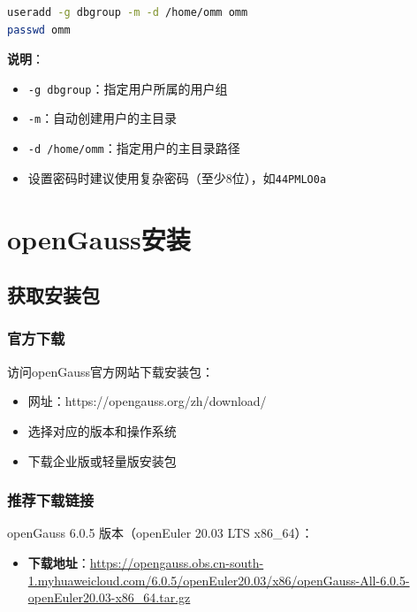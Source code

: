 \documentclass[12pt,UTF8]{ctexbook}
\begin{document}
\begin{lstlisting}[language=bash, caption=创建数据库用户]
useradd -g dbgroup -m -d /home/omm omm
passwd omm
\end{lstlisting}

\textbf{说明}：
\begin{itemize}[leftmargin=2cm]
    \item \texttt{-g dbgroup}：指定用户所属的用户组
    \item \texttt{-m}：自动创建用户的主目录
    \item \texttt{-d /home/omm}：指定用户的主目录路径
    \item 设置密码时建议使用复杂密码（至少8位），如\texttt{44PMLO0a}
\end{itemize}

\chapter{openGauss安装}

\section{获取安装包}

\subsection{官方下载}

访问openGauss官方网站下载安装包：

\begin{itemize}[leftmargin=2cm]
    \item 网址：https://opengauss.org/zh/download/
    \item 选择对应的版本和操作系统
    \item 下载企业版或轻量版安装包
\end{itemize}

\subsection{推荐下载链接}

openGauss 6.0.5 版本（openEuler 20.03 LTS x86\_64）：

\begin{itemize}[leftmargin=2cm]
    \item \textbf{下载地址}：\url{https://opengauss.obs.cn-south-1.myhuaweicloud.com/6.0.5/openEuler20.03/x86/openGauss-All-6.0.5-openEuler20.03-x86_64.tar.gz}
\end{itemize}
\end{document}
